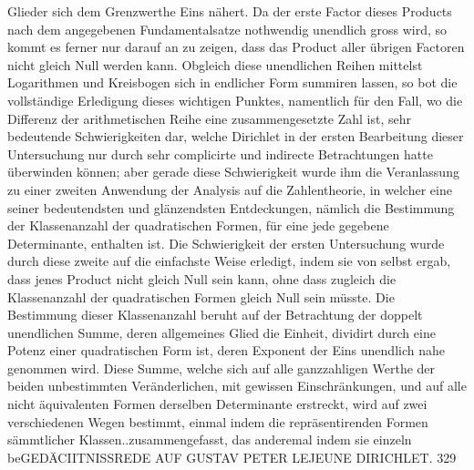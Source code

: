\documentclass[11pt]{article}
\begin{document}
Glieder sich dem Grenzwerthe Eins nähert. Da der erste Factor dieses Products nach dem angegebenen Fundamentalsatze nothwendig unendlich gross wird, so kommt es ferner nur darauf an zu zeigen, dass das Product aller übrigen Factoren nicht gleich Null werden kann. Obgleich diese unendlichen Reihen mittelst Logarithmen und Kreisbogen sich in endlicher Form summiren lassen, so bot die vollständige Erledigung dieses wichtigen Punktes, namentlich für den Fall, wo die Differenz der arithmetischen Reihe eine zusammengesetzte Zahl ist, sehr bedeutende Schwierigkeiten dar, welche Dirichlet in der ersten Bearbeitung dieser Untersuchung nur durch sehr complicirte und indirecte Betrachtungen hatte überwinden können; aber gerade diese Schwierigkeit wurde ihm die Veranlassung zu einer zweiten Anwendung der Analysis auf die Zahlentheorie, in welcher eine seiner bedeutendsten und glänzendsten Entdeckungen, nämlich die Bestimmung der Klassenanzahl der quadratischen Formen, für eine jede gegebene Determinante, enthalten ist. Die Schwierigkeit der ersten Untersuchung wurde durch diese zweite auf die einfachste Weise erledigt, indem sie von selbst ergab, dass jenes Product nicht gleich Null sein kann, ohne dass zugleich die Klassenanzahl der quadratischen Formen gleich Null sein müsste. Die Bestimmung dieser Klassenanzahl beruht auf der Betrachtung der doppelt unendlichen Summe, deren allgemeines Glied die Einheit, dividirt durch eine Potenz einer quadratischen Form ist, deren Exponent der Eins unendlich nahe genommen wird. Diese Summe, welche sich auf alle ganzzahligen Werthe der beiden unbestimmten Veränderlichen, mit gewissen Einschränkungen, und auf alle nicht äquivalenten Formen derselben Determinante erstreckt, wird auf zwei verschiedenen Wegen bestimmt, einmal indem die repräsentirenden Formen sämmtlicher Klassen..zusammengefasst, das anderemal indem sie einzeln beGEDÄCIITNISSREDE AUF GUSTAV PETER LEJEUNE DIRICHLET. 329
\par
\end{document}
